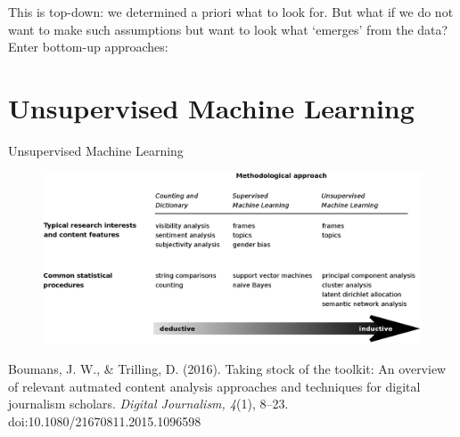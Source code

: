 \documentclass{beamer}
\begin{document}
\begin{frame}[plain]
This is {\huge{top-down}}: we determined a priori what to look for.
\vspace{2cm}
But what if we do not want to make such assumptions but want to look what `emerges' from the data? Enter {\huge{bottom-up}} approaches:
\end{frame}


\section{Unsupervised Machine Learning}

\begin{frame}
	Unsupervised Machine Learning
\end{frame}



\begin{frame}[plain]
	\begin{figure}
		\centering
		\includegraphics[width=1.0\linewidth]{boumanstrilling2016}
		\label{fig:boumanstrilling2016}
	\end{figure}
	\tiny{Boumans, J. W., \& Trilling, D. (2016). Taking stock of the toolkit: An overview of relevant autmated content analysis approaches and techniques for digital journalism scholars. \emph{Digital Journalism, 4}(1), 8–23. doi:10.1080/21670811.2015.1096598}
\end{frame}
\end{document}
